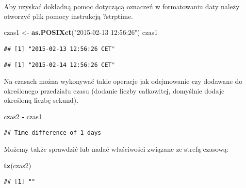 \documentclass[]{book}
\newenvironment{Shaded}{\begin{snugshade}}{\end{snugshade}}
\newcommand{\KeywordTok}[1]{\textcolor[rgb]{0.13,0.29,0.53}{\textbf{#1}}}
\newcommand{\DataTypeTok}[1]{\textcolor[rgb]{0.13,0.29,0.53}{#1}}
\newcommand{\StringTok}[1]{\textcolor[rgb]{0.31,0.60,0.02}{#1}}
\newcommand{\OperatorTok}[1]{\textcolor[rgb]{0.81,0.36,0.00}{\textbf{#1}}}
\newcommand{\NormalTok}[1]{#1}
\theoremstyle{definition}
\theoremstyle{definition}
\theoremstyle{definition}
\theoremstyle{remark}
\begin{document}
Aby uzyskać dokładną pomoc dotyczącą oznaczeń w formatowaniu daty należy
otworzyć plik pomocy instrukcją ?strptime.

\begin{Shaded}
\begin{Highlighting}[]
\NormalTok{czas1 <-}\StringTok{ }\KeywordTok{as.POSIXct}\NormalTok{(}\StringTok{"2015-02-13 12:56:26"}\NormalTok{)}
\NormalTok{czas1}
\end{Highlighting}
\end{Shaded}

\begin{verbatim}
## [1] "2015-02-13 12:56:26 CET"
\end{verbatim}

\begin{Shaded}
\end{Shaded}

\begin{verbatim}
## [1] "2015-02-14 12:56:26 CET"
\end{verbatim}

Na czasach można wykonywać takie operacje jak odejmowanie czy dodawane
do określonego przedziału czasu (dodanie liczby całkowitej, domyślnie
dodaje określoną liczbę sekund).

\begin{Shaded}
\begin{Highlighting}[]
\NormalTok{czas2 }\OperatorTok{-}\StringTok{ }\NormalTok{czas1}
\end{Highlighting}
\end{Shaded}

\begin{verbatim}
## Time difference of 1 days
\end{verbatim}

Możemy także sprawdzić lub nadać właściwości związane ze strefą czasową:

\begin{Shaded}
\begin{Highlighting}[]
\KeywordTok{tz}\NormalTok{(czas2)}
\end{Highlighting}
\end{Shaded}

\begin{verbatim}
## [1] ""
\end{verbatim}
\end{document}

